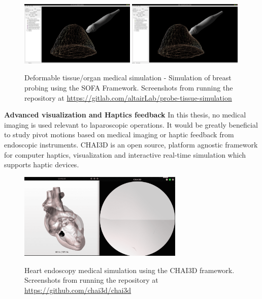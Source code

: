 \begin{center}
\begin{figure}[!htb]
\centering
\includegraphics[width=0.49\textwidth]{images/future-work-sofa1.png}
\includegraphics[width=0.49\textwidth]{images/future-work-sofa2.png}\\
\caption{Deformable tissue/organ medical simulation - Simulation of breast probing using the SOFA Framework. Screenshots from running the repository at
\url{https://gitlab.com/altairLab/probe-tissue-simulation}}
\end{figure}
\end{center}

\textbf{Advanced visualization and Haptics feedback}
In this thesis, no medical imaging is used relevant to laparoscopic operations. It would be greatly beneficial to study pivot motions based on medical imaging or haptic feedback from endoscopic instruments. CHAI3D is 
an open source, platform agnostic framework for computer haptics, visualization and interactive real-time simulation which supports haptic devices.

\begin{center}
\begin{figure}[!htb]
\centering
\includegraphics[width=0.7\textwidth]{images/future-work-chai3d.png}\\
\caption{Heart endoscopy medical simulation using the CHAI3D framework. Screenshots from running the repository at
\url{https://github.com/chai3d/chai3d}}
\end{figure}
\end{center}


